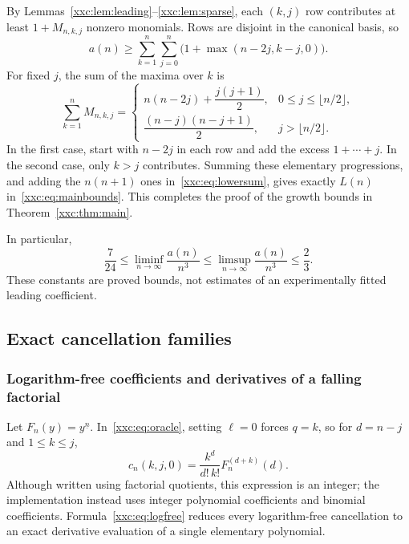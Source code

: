 \documentclass[11pt,a4paper]{article}
\numberwithin{equation}{section}
\theoremstyle{definition}
\theoremstyle{remark}
\theoremstyle{plain}
\newcommand{\fall}[2]{#1^{\underline{#2}}}
\begin{document}
By Lemmas~\ref{xxc:lem:leading}--\ref{xxc:lem:sparse}, each $(k,j)$ row contributes at
least $1+M_{n,k,j}$ nonzero monomials. Rows are disjoint in the canonical
basis, so
\begin{equation}\label{xxc:eq:lowersum}
 a(n)\ge\sum_{k=1}^n\sum_{j=0}^n
 \bigl(1+\max(n-2j,k-j,0)\bigr).
\end{equation}
For fixed $j$, the sum of the maxima over $k$ is
\begin{equation}\label{xxc:eq:Mslice}
 \sum_{k=1}^n M_{n,k,j}=
 \begin{cases}
 n(n-2j)+\dfrac{j(j+1)}2,&0\le j\le\lfloor n/2\rfloor,\\[5pt]
 \dfrac{(n-j)(n-j+1)}2,&j>\lfloor n/2\rfloor.
 \end{cases}
\end{equation}
In the first case, start with $n-2j$ in each row and add the excess
$1+\cdots+j$. In the second case, only $k>j$ contributes.
Summing these elementary progressions, and adding the $n(n+1)$ ones
in~\eqref{xxc:eq:lowersum}, gives exactly $L(n)$ in~\eqref{xxc:eq:mainbounds}.
This completes the proof of the growth bounds in Theorem~\ref{xxc:thm:main}.

In particular,
\begin{equation}\label{xxc:eq:limbounds}
 \frac7{24}\le\liminf_{n\to\infty}\frac{a(n)}{n^3}
 \le\limsup_{n\to\infty}\frac{a(n)}{n^3}\le\frac23.
\end{equation}
These constants are proved bounds, not estimates of an experimentally fitted
leading coefficient.

\subsection{Exact cancellation families}

\subsubsection{Logarithm-free coefficients and derivatives of a falling factorial}

Let $F_n(y)=\fall{y}{n}$. In~\eqref{xxc:eq:oracle}, setting $\ell=0$ forces
$q=k$, so for $d=n-j$ and $1\le k\le j$,
\begin{equation}\label{xxc:eq:logfree}
\boxed{\displaystyle
 c_n(k,j,0)=\frac{k^d}{d!\,k!}F_n^{(d+k)}(d).}
\end{equation}
Although written using factorial quotients, this expression is an integer;
the implementation instead uses integer polynomial coefficients and binomial
coefficients. Formula~\eqref{xxc:eq:logfree} reduces every logarithm-free
cancellation to an exact derivative evaluation of a single elementary
polynomial.
\end{document}
